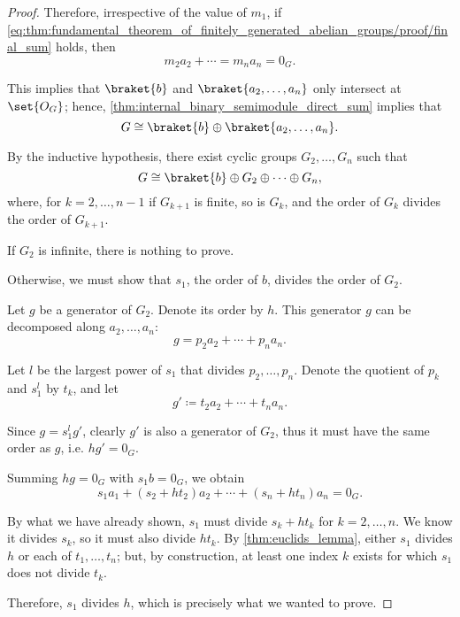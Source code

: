 \begin{proof}
  Therefore, irrespective of the value of \( m_1 \), if \eqref{eq:thm:fundamental_theorem_of_finitely_generated_abelian_groups/proof/final_sum} holds, then
  \begin{equation*}
    m_2 a_2 + \cdots = m_n a_n = 0_G.
  \end{equation*}

  This implies that \( \braket{ b } \) and \( \braket{ a_2, \ldots, a_n } \) only intersect at \( \set{ O_G } \); hence, \cref{thm:internal_binary_semimodule_direct_sum} implies that
  \begin{equation*}
    G \cong \braket{ b } \oplus \braket{ a_2, \ldots, a_n }.
  \end{equation*}

  By the inductive hypothesis, there exist cyclic groups \( G_2, \ldots, G_n \) such that
  \begin{equation*}
    G \cong \braket{ b } \oplus G_2 \oplus \cdots \oplus G_n,
  \end{equation*}
  where, for \( k = 2, \ldots, n - 1 \) if \( G_{k+1} \) is finite, so is \( G_k \), and the order of \( G_k \) divides the order of \( G_{k+1} \).

   If \( G_2 \) is infinite, there is nothing to prove.

  Otherwise, we must show that \( s_1 \), the order of \( b \), divides the order of \( G_2 \).

  Let \( g \) be a generator of \( G_2 \). Denote its order by \( h \). This generator \( g \) can be decomposed along \( a_2, \ldots, a_n \):
  \begin{equation*}
    g = p_2 a_2 + \cdots + p_n a_n.
  \end{equation*}

  Let \( l \) be the largest power of \( s_1 \) that divides \( p_2, \ldots, p_n \). Denote the quotient of \( p_k \) and \( s_1^l \) by \( t_k \), and let
  \begin{equation*}
    g' \coloneqq t_2 a_2 + \cdots + t_n a_n.
  \end{equation*}

  Since \( g = s_1^l g' \), clearly \( g' \) is also a generator of \( G_2 \), thus it must have the same order as \( g \), i.e. \( h g' = 0_G \).

  Summing \( h g = 0_G \) with \( s_1 b = 0_G \), we obtain
  \begin{equation*}
    s_1 a_1 + (s_2 + h t_2) a_2 + \cdots + (s_n + h t_n) a_n = 0_G.
  \end{equation*}

  By what we have already shown, \( s_1 \) must divide \( s_k + h t_k \) for \( k = 2, \ldots, n \). We know it divides \( s_k \), so it must also divide \( h t_k \). By \cref{thm:euclids_lemma}, either \( s_1 \) divides \( h \) or each of \( t_1, \ldots, t_n \); but, by construction, at least one index \( k \) exists for which \( s_1 \) does not divide \( t_k \).

  Therefore, \( s_1 \) divides \( h \), which is precisely what we wanted to prove.
\end{proof}

